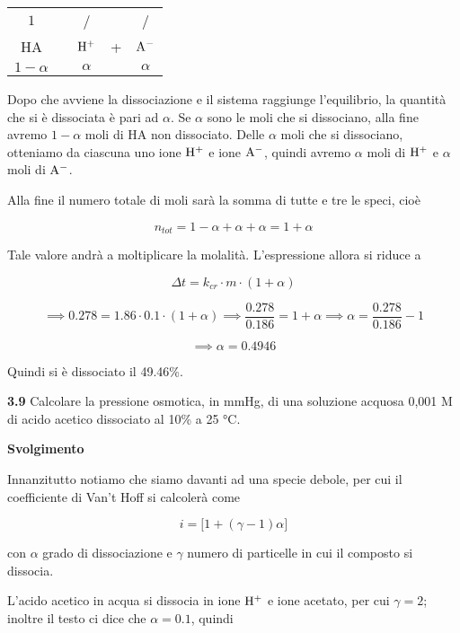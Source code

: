 \begin{center}
    \begin{tabular}{ccccc}
        $1$ & & / & & /\\
        HA & \ce{<-->} & $\rm H^+$ & + & $\rm A^-$\\
        $1 - \alpha$ &  &  $\alpha$ & & $\alpha$\\
    \end{tabular}
\end{center}

Dopo che avviene la dissociazione e il sistema raggiunge l'equilibrio, la quantità che si è dissociata è pari ad $\alpha$. Se $\alpha$ sono le moli che si dissociano, alla fine avremo $1-\alpha$ moli di HA non dissociato. Delle $\alpha$ moli che si dissociano, otteniamo da ciascuna uno ione $\rm H^+$ e ione $\rm A^-$, quindi avremo $\alpha$ moli di $\rm H^+$ e $\alpha$ moli di $\rm A^-$.

Alla fine il numero totale di moli sarà la somma di tutte e tre le speci, cioè

$$n_{tot}=1 - \alpha + \alpha + \alpha=1+\alpha$$

Tale valore andrà a moltiplicare la molalità. L'espressione allora si riduce a

$$\Delta t=k_{cr} \cdot m \cdot (1 + \alpha)$$

$$\implies
0.278 = 1.86 \cdot 0.1 \cdot (1+\alpha)
\implies
\frac{0.278}{0.186}= 1 + \alpha
\implies
\alpha=\frac{0.278}{0.186} - 1$$

$$\implies \alpha=0.4946$$

Quindi si è dissociato il 49.46\%.

\vspace{0.2cm}\textbf{3.9} Calcolare la pressione osmotica, in mmHg, di una soluzione acquosa 0,001 M di acido acetico dissociato al 10\% a 25 °C.

\vspace{0.2cm}\large\textbf{Svolgimento}\normalsize

\vspace{0.2cm}Innanzitutto notiamo che siamo davanti ad una specie debole, per cui il coefficiente di Van't Hoff si calcolerà come

$$i=\big[1 + (\gamma -1)\alpha\big]$$

con $\alpha$ grado di dissociazione e $\gamma$ numero di particelle in cui il composto si dissocia.

L'acido acetico in acqua si dissocia in ione $\rm H^+$ e ione acetato, per cui $\gamma=2$; inoltre il testo ci dice che $\alpha=0.1$, quindi

